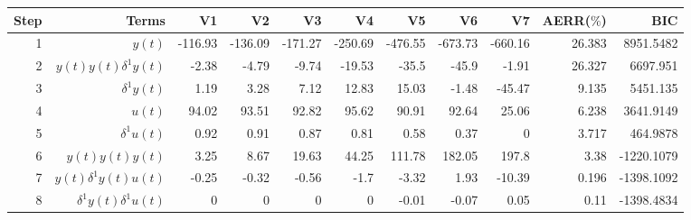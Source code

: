 \begin{tabular}{rrrrrrrrrrr}
Step & Terms & V1 & V2 & V3 & V4 & V5 & V6 & V7 & AERR($\%$) & BIC \\ 
\hline 
1 & $y(t)$ & -116.93 & -136.09 & -171.27 & -250.69 & -476.55 & -673.73 & -660.16 & 26.383 & 8951.5482 \\ 
2 & $y(t)y(t)\delta^1 y(t)$ & -2.38 & -4.79 & -9.74 & -19.53 & -35.5 & -45.9 & -1.91 & 26.327 & 6697.951 \\ 
3 & $\delta^1 y(t)$ & 1.19 & 3.28 & 7.12 & 12.83 & 15.03 & -1.48 & -45.47 & 9.135 & 5451.135 \\ 
4 & $u(t)$ & 94.02 & 93.51 & 92.82 & 95.62 & 90.91 & 92.64 & 25.06 & 6.238 & 3641.9149 \\ 
5 & $\delta^1 u(t)$ & 0.92 & 0.91 & 0.87 & 0.81 & 0.58 & 0.37 & 0 & 3.717 & 464.9878 \\ 
6 & $y(t)y(t)y(t)$ & 3.25 & 8.67 & 19.63 & 44.25 & 111.78 & 182.05 & 197.8 & 3.38 & -1220.1079 \\ 
7 & $y(t)\delta^1 y(t)u(t)$ & -0.25 & -0.32 & -0.56 & -1.7 & -3.32 & 1.93 & -10.39 & 0.196 & -1398.1092 \\ 
8 & $\delta^1 y(t)\delta^1 u(t)$ & 0 & 0 & 0 & 0 & -0.01 & -0.07 & 0.05 & 0.11 & -1398.4834 \\ 
\hline 
\end{tabular}